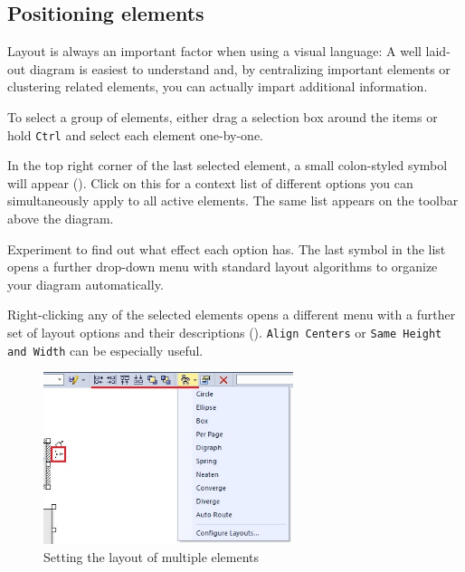 \subsection{Positioning elements}

Layout is always an important factor when using a visual language:
A well laid-out diagram is easiest to understand and, by centralizing important
elements or clustering related elements, you can actually impart additional information.

\begin{stepbystep}
\item To select a group of elements, either drag a selection box around the items or hold \texttt{Ctrl} and select each element
one-by-one.

\item In the top right corner of the last selected element, a small colon-styled symbol will appear (). Click on
this for a context list of different options you can simultaneously apply to all active elements. The same list appears on the toolbar above the
diagram. 

\item Experiment to find out what effect each option has. The last symbol in the list opens a further drop-down menu with standard layout
algorithms to organize your diagram automatically.

\item Right-clicking any of the selected elements opens a different menu with a further set of layout options and their descriptions
(). \texttt{Align Centers} or \texttt{Same Height and Width} can be especially useful.

\begin{figure}[htbp]
\begin{center} 
  \includegraphics[width=0.65\textwidth]{ea_layoutElementsCommonContext}
  \caption{Setting the layout of multiple elements}  
  \label{ea:layout1}
\end{center}
\end{figure}


\end{stepbystep}
